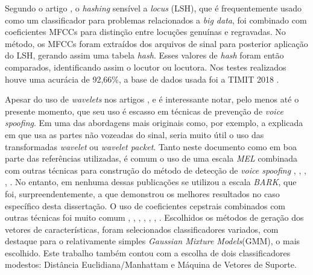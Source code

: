 		\par Segundo o artigo \cite{8396208}, o \textit{hashing} sensível a \textit{locus} (LSH), que é frequentemente usado como um classificador para problemas relacionados a \textit{big data}, foi combinado com coeficientes MFCCs para distinção entre locuções genuínas e regravadas. No método, os MFCCs foram extraídos dos arquivos de sinal para posterior aplicação do LSH, gerando assim uma tabela \textit{hash}. Esses valores de \textit{hash} foram então comparados, identificando assim o locutor ou locutora. Nos testes realizados houve uma acurácia de 92,66\%, a base de dados usada foi a TIMIT 2018 \cite{TIMIT2018}. \\

		\par Apesar do uso de \textit{wavelets} nos artigos \cite{DiqunYan2019}, \cite{Patel2015} e \cite{7802552} é interessante notar, pelo menos até o presente momento, que seu uso é escasso em técnicas de prevenção de \textit{voice spoofing}. Em uma das abordagens mais originais como, por exemplo, a explicada em \cite{ISI:000490497200068} que usa as partes não vozeadas do sinal, seria muito útil o uso das transformadas \textit{wavelet} ou \textit{wavelet packet}. Tanto neste documento como em boa parte das referências utilizadas, é comum o uso de uma escala \textit{MEL} combinada com outras técnicas para construção do método de detecção de \textit{voice spoofing} \cite{Hanilci2018}, \cite{Patel2015}, \cite{8396208}, \cite{8725688}, \cite{ISI:000490497200068}. No entanto, em nenhuma dessas publicações se utilizou a escala \textit{BARK}, que foi, surpreendentemente, a que demonstrou  os melhores resultados no caso específico desta dissertação. O uso de coeficientes cepstrais combinados com outras técnicas foi muito comum \cite{alluri2019replay}, \cite{7802552}, \cite{8725688}, \cite{Hanilci2018}, \cite{TODISCO2017516}, \cite{Patel2015}, \cite{ISI:000392503100008}. Escolhidos os métodos de geração dos vetores de características, foram selecionados classificadores variados, com destaque para o relativamente simples \textit{Gaussian Mixture Models}(GMM), o mais escolhido. Este trabalho também contou com a escolha de dois classificadores modestos: Distância Euclidiana/Manhattam e Máquina de Vetores de Suporte.\\
		
